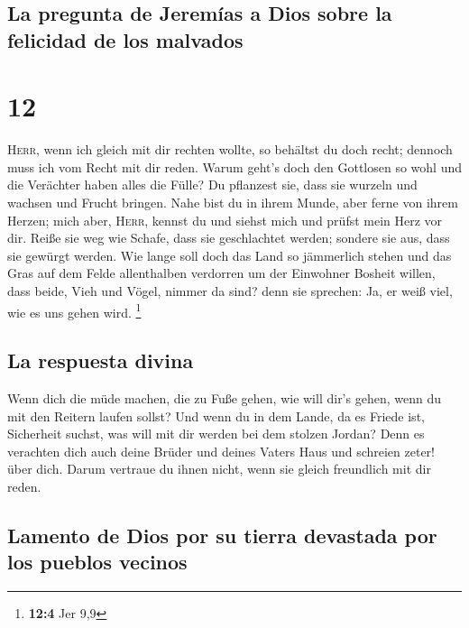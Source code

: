 \hypertarget{la-pregunta-de-jeremuxedas-a-dios-sobre-la-felicidad-de-los-malvados}{%
\subsection{La pregunta de Jeremías a Dios sobre la felicidad de los
malvados}\label{la-pregunta-de-jeremuxedas-a-dios-sobre-la-felicidad-de-los-malvados}}

\hypertarget{section-11}{%
\section{12}\label{section-11}}

 \textsc{Herr}, wenn ich gleich mit dir rechten wollte, so
behältst du doch recht; dennoch muss ich vom Recht mit dir reden. Warum
geht's doch den Gottlosen so wohl und die Verächter haben alles die
Fülle?  Du pflanzest sie, dass sie wurzeln und wachsen und
Frucht bringen. Nahe bist du in ihrem Munde, aber ferne von ihrem
Herzen;  mich aber, \textsc{Herr}, kennst du und siehst
mich und prüfst mein Herz vor dir. Reiße sie weg wie Schafe, dass sie
geschlachtet werden; sondere sie aus, dass sie gewürgt werden.
 Wie lange soll doch das Land so jämmerlich stehen und das
Gras auf dem Felde allenthalben verdorren um der Einwohner Bosheit
willen, dass beide, Vieh und Vögel, nimmer da sind? denn sie sprechen:
Ja, er weiß viel, wie es uns gehen wird. \footnote{\textbf{12:4} Jer 9,9}

\hypertarget{la-respuesta-divina}{%
\subsection{La respuesta divina}\label{la-respuesta-divina}}

 Wenn dich die müde machen, die zu Fuße gehen, wie will
dir's gehen, wenn du mit den Reitern laufen sollst? Und wenn du in dem
Lande, da es Friede ist, Sicherheit suchst, was will mit dir werden bei
dem stolzen Jordan?  Denn es verachten dich auch deine
Brüder und deines Vaters Haus und schreien zeter! über dich. Darum
vertraue du ihnen nicht, wenn sie gleich freundlich mit dir reden.

\hypertarget{lamento-de-dios-por-su-tierra-devastada-por-los-pueblos-vecinos}{%
\subsection{Lamento de Dios por su tierra devastada por los pueblos
vecinos}\label{lamento-de-dios-por-su-tierra-devastada-por-los-pueblos-vecinos}}

